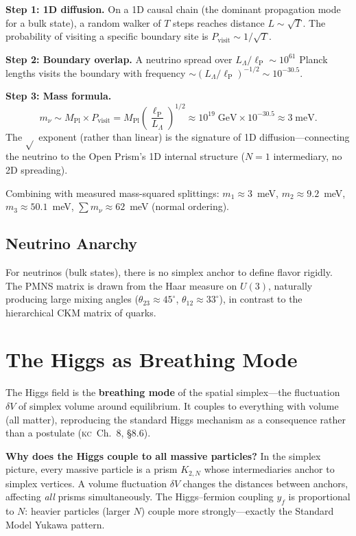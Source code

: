 \documentclass[11pt, a4paper, openany]{book}
\newcommand{\lP}{\ell_{\mathrm{P}}}
\newcommand{\MPl}{M_{\mathrm{Pl}}}
\newcommand{\KC}[1]{\textnormal{(\textsc{kc}~#1)}}
\begin{document}
\textbf{Step 1: 1D diffusion.} On a 1D causal chain (the dominant
propagation mode for a bulk state), a random walker of $T$ steps
reaches distance $L \sim \sqrt{T}$. The probability of visiting a
specific boundary site is $P_{\mathrm{visit}} \sim 1/\sqrt{T}$.

\textbf{Step 2: Boundary overlap.} A neutrino spread over
$L_\Lambda/\lP \sim 10^{61}$ Planck lengths visits the boundary with
frequency $\sim (L_\Lambda/\lP)^{-1/2} \sim 10^{-30.5}$.

\textbf{Step 3: Mass formula.}
\[
  m_\nu \sim \MPl \times P_{\mathrm{visit}}
  = \MPl \left(\frac{\lP}{L_\Lambda}\right)^{1/2}
  \approx 10^{19}\;\mathrm{GeV} \times 10^{-30.5}
  \approx 3\;\mathrm{meV}.
\]
The $\sqrt{}$ exponent (rather than linear) is the signature of 1D
diffusion---connecting the neutrino to the Open Prism's 1D internal
structure ($N = 1$ intermediary, no 2D spreading).

\noindent
Combining with measured mass-squared splittings: $m_1 \approx 3$~meV,
$m_2 \approx 9.2$~meV, $m_3 \approx 50.1$~meV,
$\sum m_\nu \approx 62$~meV (normal ordering).

\subsection{Neutrino Anarchy}

For neutrinos (bulk states), there is no simplex anchor to define flavor rigidly. The PMNS matrix is drawn from the Haar measure on $U(3)$, naturally producing large mixing angles ($\theta_{23} \approx 45^\circ$, $\theta_{12} \approx 33^\circ$), in contrast to the hierarchical CKM matrix of quarks.

\section{The Higgs as Breathing Mode}\label{sec:higgs}

The Higgs field is the \textbf{breathing mode} of the spatial
simplex---the fluctuation $\delta V$ of simplex volume around
equilibrium. It couples to everything with volume (all matter),
reproducing the standard Higgs mechanism as a consequence rather than
a postulate \KC{Ch.~8, \S8.6}.

\textbf{Why does the Higgs couple to all massive particles?} In the
simplex picture, every massive particle is a prism $K_{2,N}$ whose
intermediaries anchor to simplex vertices. A volume fluctuation
$\delta V$ changes the distances between anchors, affecting \emph{all}
prisms simultaneously. The Higgs--fermion coupling $y_f$ is
proportional to $N$: heavier particles (larger $N$) couple more
strongly---exactly the Standard Model Yukawa pattern.
\end{document}
